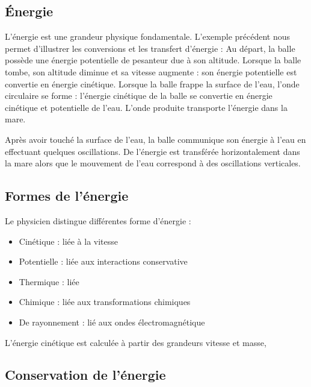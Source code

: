 \subsection{Énergie}

L'énergie est une grandeur physique fondamentale. L'exemple précédent nous permet d'illustrer les conversions et les transfert d'énergie : Au départ, la balle possède une énergie potentielle de pesanteur due à son altitude. Lorsque la balle tombe, son altitude diminue et sa vitesse augmente : son énergie potentielle est convertie en énergie cinétique.
Lorsque la balle frappe la surface de l'eau, l'onde circulaire se forme : l'énergie cinétique de la balle se convertie en énergie cinétique et potentielle de l'eau. L'onde produite transporte l'énergie dans la mare.

\vspace{0.5cm}
\begin{minipage}[c]{.45\linewidth}
Après avoir touché la surface de l'eau, la balle communique son énergie à l'eau en effectuant quelques oscillations.
De l'énergie est transférée horizontalement dans la mare alors que le mouvement de l'eau correspond à des oscillations verticales.
\end{minipage}
\hfill
\begin{minipage}[c]{.45\linewidth}

\end{minipage}


%
  \subsection{Formes de l'énergie}

Le physicien distingue différentes forme d'énergie :

	\begin{itemize}[leftmargin=1cm, label=, itemsep=1pt]
		\item Cinétique : liée à la vitesse
		\item Potentielle : liée aux interactions conservative
		\item Thermique : liée 
		\item Chimique : liée aux transformations chimiques
		\item De rayonnement : lié aux ondes électromagnétique
	\end{itemize}

L'énergie cinétique est calculée à partir des grandeurs vitesse et masse, 
%
  \subsection{Conservation de l'énergie}

